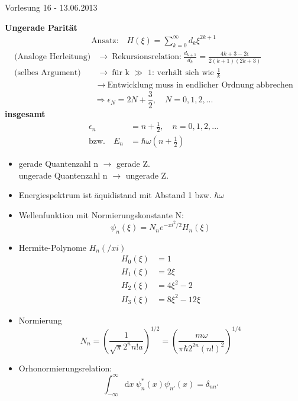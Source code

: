 \documentclass[10pt,article,colorback,accentcolor=tud9d]{scrartcl}
\begin{document}
\begin{flushright}
Vorlesung 16 - 13.06.2013
\end{flushright}
\textbf{Ungerade Parität}
\begin{align}
\text{Ansatz:} \quad H(\xi)=\sum_{k=0}^\infty d_k \xi^{2k+1}
\end{align}
\begin{align}
\text{(Analoge Herleitung)} &\rightarrow\ \text{Rekursionsrelation:}\ \frac{d_{k+1}}{d_k}=\frac{4k+3-2\epsilon}{2(k+1)(2k+3)}\\
\text{(selbes Argument)}\ &\rightarrow\ \text{für k $\gg$ 1: verhält sich wie $\frac{1}{k}$}\\
&\rightarrow\ \text{Entwicklung muss in endlicher Ordnung abbrechen}
\end{align}
\begin{equation}
\Rightarrow \epsilon_N=2N+\frac{3}{2},\quad N=0,1,2,...
\end{equation}
\textbf{insgesamt}
\begin{align}
\epsilon_n&=n+\frac{1}{2},\quad n=0,1,2,...\\
\text{bzw.} \quad E_n&=\hbar\omega(n+\frac{1}{2})
\end{align}
\begin{itemize}
  \item gerade Quantenzahl n $\rightarrow$ gerade Z.\\
    ungerade Quantenzahl n $\rightarrow$ ungerade Z.
  \item Energiespektrum ist äquidistand mit Abstand 1 bzw. $\hbar\omega$
  \item Wellenfunktion mit Normierungskonstante N:
    \begin{equation}
    \psi_n(\xi)=N_n e^{-xi^2/2}H_n(\xi)
    \end{equation}
  \item Hermite-Polynome $H_n(/xi)$
    \begin{align}
    H_0(\xi)&=1\\
    H_1(\xi)&=2\xi\\
    H_2(\xi)&=4\xi^2-2\\
    H_3(\xi)&=8\xi^2-12\xi
    \end{align}
  \item Normierung
    \begin{equation}
    N_n=\left(\frac{1}{\sqrt{\pi}2^nn!a}\right)^{1/2}=\left(\frac{m\omega}{\pi\hbar2^{2n}(n!)^2}\right)^{1/4}
    \end{equation}
  \item Orhonormierungsrelation:
    \begin{equation}
    \int_{-\infty}^\infty\text{d}x\ \psi_n^*(x)\psi_{n'}(x)=\delta_{nn'}
    \end{equation}
\end{itemize}
\end{document}
